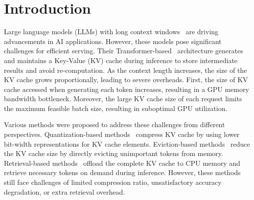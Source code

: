 \section{Introduction}


Large language models (LLMs) with long context windows~\citep{gpt-4, gemini-1.5, llama-3, mixtral, qwen-2.5, deepseek-v3} are driving advancements in AI applications. 
However, these models pose significant challenges for efficient serving. 
Their Transformer-based~\citep{transformer} architecture generates and maintains a Key-Value (KV) cache during inference to store intermediate results and avoid re-computation.  
As the context length increases, the size of the KV cache grows proportionally, leading to severe overheads.
First, the size of KV cache accessed when generating each token increases, resulting in a GPU memory bandwidth bottleneck. 
Moreover, the large KV cache size of each request limits the maximum feasible batch size, resulting in suboptimal GPU utilization.

Various methods were proposed to address these challenges from different perspectives.
Quantization-based methods~\citep{kivi, kvquant} compress KV cache by using lower bit-width representations for KV cache elements.
Eviction-based methods~\citep{streaming-llm, h2o, snapkv, pyramidinfer} reduce the KV cache size by directly evicting unimportant tokens from memory.
Retrieval-based methods~\citep{quest, loki, pqcache, clusterkv, magicpig} offload the complete KV cache to CPU memory and retrieve necessary tokens on demand during inference.
However, these methods still face challenges of limited compression ratio, unsatisfactory accuracy degradation, or extra retrieval overhead.

